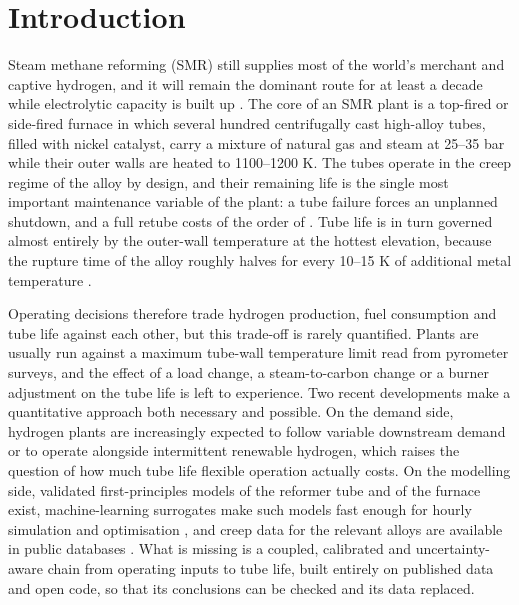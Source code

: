 \section{Introduction}
\label{sec:intro}

Steam methane reforming (SMR) still supplies most of the world's merchant and captive hydrogen, and it will remain the dominant route for at
least a decade while electrolytic capacity is built up . The core of an
SMR plant is a top-fired or side-fired furnace in which several hundred centrifugally cast high-alloy tubes, filled with nickel catalyst,
carry a mixture of natural gas and steam at 25--35 bar while their outer walls are heated to 1100--1200 K. The tubes operate in the creep
regime of the alloy by design, and their remaining life is the single most important maintenance variable of the plant: a tube
failure forces an unplanned shutdown, and a full retube costs of the order of . Tube
life is in turn governed almost entirely by the outer-wall temperature at the hottest elevation, because the rupture time of the
alloy roughly halves for every 10--15 K of additional metal temperature .

Operating decisions therefore trade hydrogen production, fuel consumption and tube life against each other, but this trade-off is
rarely quantified. Plants are usually run against a maximum tube-wall temperature limit read from pyrometer surveys, and the effect of
a load change, a steam-to-carbon change or a burner adjustment on the tube life is left to experience. Two recent developments make a
quantitative approach both necessary and possible. On the demand side, hydrogen plants are increasingly expected to follow variable
downstream demand or to operate alongside intermittent renewable hydrogen, which raises the question of how much tube life
flexible operation actually costs. On the modelling side, validated first-principles models of the reformer tube
\cite{xu1989a,xu1989b,plehiers1989,pantoleontos2012} and of the furnace \cite{latham2011,zamaniyan2008} exist, machine-learning
surrogates make such models fast enough for hourly simulation and optimisation \cite{lao2016,tran2017,kumar2015,kumar2017}, and creep
data for the relevant alloys are available in public databases \cite{nims1990,nims1991}. What is missing is a coupled, calibrated and
uncertainty-aware chain from operating inputs to tube life, built entirely on published data and open code, so that its conclusions
can be checked and its data replaced.


